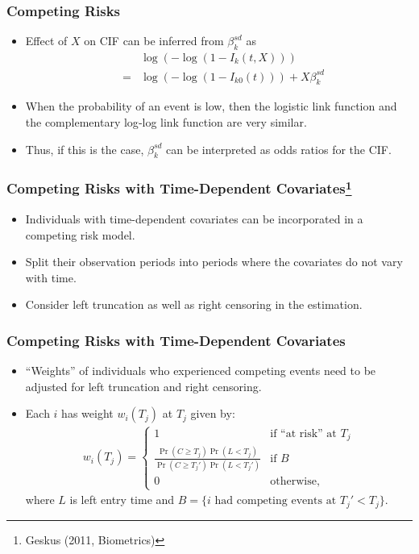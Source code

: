 \documentclass[14pt]{beamer}
\begin{document}
	\begin{frame}
	\frametitle{Competing Risks}
	\begin{itemize}
	\item Effect of $X$ on CIF can be inferred from $\beta_k^{sd}$ as
	\begin{eqnarray*}
	&\phantom{=}& \log(-\log(1 - I_k(t,X)))\\
	&=& \log(-\log(1 - I_{k0}(t))) + X \beta_k^{sd}
	\end{eqnarray*}
	\item When the probability of an event is low, then the logistic link function and the complementary log‐log link function are very similar.
	\item Thus, if this is the case, $\beta_k^{sd}$ can be interpreted as odds ratios for the CIF.

	\end{itemize}

	\end{frame}

	\begin{frame}
	\frametitle{Competing Risks with Time-Dependent Covariates\footnote{Geskus (2011, Biometrics)}}
	\begin{itemize}
	\item Individuals with time-dependent covariates can be incorporated in a competing risk model.
	\item Split their observation periods into periods where the covariates do not vary with time.
	\item Consider left truncation as well as right censoring in the estimation.

	\end{itemize}

	\end{frame}

	\begin{frame}
	\frametitle{Competing Risks with Time-Dependent Covariates}
	\begin{itemize}
	\item ``Weights'' of individuals who experienced competing events need to be adjusted for left truncation and right censoring.
	\item Each $i$ has weight $w_i(T_j)$ at $T_j$ given by:
	\begin{eqnarray*}
	w_i(T_j) =
	\begin{cases}
	1 & \text{if ``at risk'' at $T_j$}\\
	\frac{\Pr(C \geq T_j) \Pr(L < T_j)}{\Pr(C \geq T_j') \Pr(L < T_j')} & \text{if $B$}\\
	0 & \text{otherwise},
	\end{cases}
	\end{eqnarray*}
	where $L$ is left entry time and $B = \{i \text{ had competing events at } T_j' < T_j\}$.

	\end{itemize}

	\end{frame}
\end{document}

